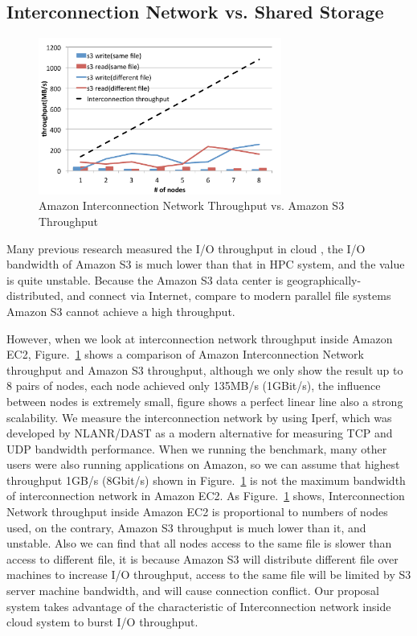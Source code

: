 \subsection{Interconnection Network vs. Shared Storage}

\begin{figure}
\centering
\includegraphics[width=8cm]{img/amazon_throughput}
\caption{Amazon Interconnection Network Throughput vs. Amazon S3 Throughput}
\label{background:amazon throughput}
\end{figure}

Many previous research measured the I/O throughput in cloud \cite{Chiba,Transactions_a_la_carte,
Interactive_Use_of_Cloud_Services,Amazon_S3_for_Science_Grids,anevaluation}, the I/O bandwidth of
Amazon S3 is much lower than that in HPC system, and the value is quite unstable\cite{anevaluation}.
Because the Amazon S3 data center is geographically-distributed, and connect via Internet, compare
to modern parallel file systems Amazon S3 cannot achieve a high throughput.
 
However, when we look at interconnection network throughput inside Amazon EC2,
Figure.~\ref{background:amazon throughput} shows a comparison of Amazon Interconnection Network
throughput and Amazon S3 throughput, although we only show the result up to 8 pairs of nodes, each
node achieved only 135MB/s (1GBit/s), the influence between nodes is extremely small, figure shows a perfect linear line also a strong scalability.
We measure the interconnection network by using Iperf\cite{iperf}, which was developed by NLANR/DAST
as a modern alternative for measuring TCP and UDP bandwidth performance.
When we running the
benchmark, many other users were also running applications on Amazon, so we can assume that highest
throughput 1GB/s (8Gbit/s) shown in Figure.~\ref{background:amazon throughput} is not the
maximum bandwidth of interconnection network in Amazon EC2.
As Figure.~\ref{background:amazon throughput} shows, Interconnection Network throughput inside
Amazon EC2 is proportional to numbers of nodes used, on the contrary, Amazon S3 throughput is much
lower than it, and unstable.
Also we can find that all nodes access to the same file is slower than access to different file,
it is because Amazon S3 will distribute different file over machines to increase I/O throughput,
access to the same file will be limited by S3 server machine bandwidth, and will cause connection
conflict.
Our proposal system takes advantage of the characteristic of
Interconnection network inside cloud system to burst I/O throughput.

